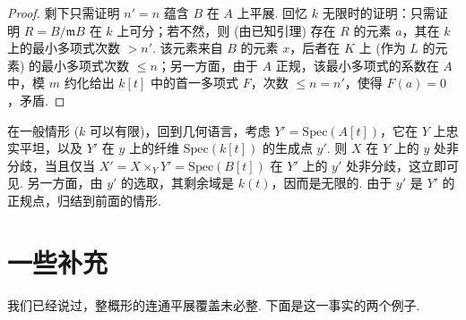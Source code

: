 \begin{proof}
剩下只需证明 $n' = n$ 蕴含 $B$ 在 $A$ 上平展. 回忆 $k$ 无限时的证明：只需证明 $R = B/\mathfrak{m}B$ 在 $k$ 上可分；若不然，则 (由已知引理) 存在 $R$ 的元素 $a$，其在 $k$ 上的最小多项式次数 $> n'$. 该元素来自 $B$ 的元素 $x$，后者在 $K$ 上 (作为 $L$ 的元素) 的最小多项式次数 $\leqslant n$；另一方面，由于 $A$ 正规，该最小多项式的系数在 $A$ 中，模 $m$ 约化给出 $k[t]$ 中的首一多项式 $F$，次数 $\leqslant n = n'$，使得 $F(a) = 0$，矛盾.
\end{proof}

在一般情形 ($k$ 可以有限)，回到几何语言，考虑 $Y' = \mathrm{Spec}(A[t])$，它在 $Y$ 上忠实平坦，以及 $Y'$ 在 $y$ 上的纤维 $\mathrm{Spec}(k[t])$ 的生成点 $y'$. 则 $X$ 在 $Y$ 上的 $y$ 处非分歧，当且仅当 $X' = X \times_Y Y' = \mathrm{Spec}(B[t])$ 在 $Y'$ 上的 $y'$ 处非分歧，这立即可见. 另一方面，由 $y'$ 的选取，其剩余域是 $k(t)$，因而是无限的. 由于 $y'$ 是 $Y'$ 的正规点，归结到前面的情形.

\section{一些补充}

我们已经说过，整概形的连通平展覆盖未必整. 下面是这一事实的两个例子.

